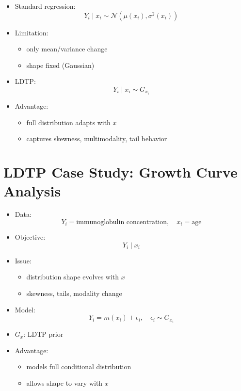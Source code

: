 \documentclass[12pt,oneside]{book}
\numberwithin{equation}{section}
\theoremstyle{definition}
\theoremstyle{plain}
\theoremstyle{remark}
\begin{document}
\begin{itemize}
\item Standard regression:
\[
Y_i \mid x_i \sim \mathcal{N}(\mu(x_i), \sigma^2(x_i))
\]

\item Limitation:
\begin{itemize}
\item only mean/variance change
\item shape fixed (Gaussian)
\end{itemize}

\item LDTP:
\[
Y_i \mid x_i \sim G_{x_i}
\]

\item Advantage:
\begin{itemize}
\item full distribution adapts with $x$
\item captures skewness, multimodality, tail behavior
\end{itemize}
\end{itemize}

\section{LDTP Case Study: Growth Curve Analysis}

\begin{itemize}
\item Data:
\[
Y_i = \text{immunoglobulin concentration}, \quad x_i = \text{age}
\]

\item Objective:
\[
Y_i \mid x_i
\]

\item Issue:
\begin{itemize}
\item distribution shape evolves with $x$
\item skewness, tails, modality change
\end{itemize}

\item Model:
\[
Y_i = m(x_i) + \epsilon_i, \quad \epsilon_i \sim G_{x_i}
\]

\item $G_x$: LDTP prior

\item Advantage:
\begin{itemize}
\item models full conditional distribution
\item allows shape to vary with $x$
\end{itemize}
\end{itemize}
\end{document}
